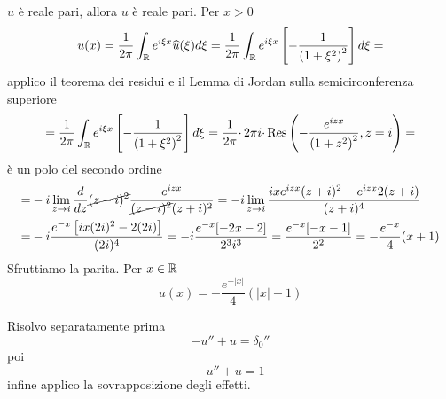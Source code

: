 $\hat{u}$ è reale pari, allora $u$ è reale pari. Per $x >0$
\begin{equation*}
u( x) =\frac{1}{2\pi }\int _{\mathbb{R} } e^{i\xi x}\widehat{u}( \xi ) d\xi =\frac{1}{2\pi }\int _{\mathbb{R} } e^{i\xi x}\left[ -\frac{1}{\left( 1+\xi ^{2}\right)^{2}}\right] d\xi =
\end{equation*}
applico il teorema dei residui e il Lemma di Jordan sulla semicirconferenza superiore
\begin{equation*}
=\frac{1}{2\pi }\int _{\mathbb{R} } e^{i\xi x}\left[ -\frac{1}{\left( 1+\xi ^{2}\right)^{2}}\right] d\xi =\frac{1}{2\pi } \cdotp 2\pi i\cdotp \mathrm{Res}\left( -\frac{e^{izx}}{\left( 1+z^{2}\right)^{2}} ,z=i\right) =
\end{equation*}
è un polo del secondo ordine
\begin{equation*}
\begin{aligned}
= & -i\lim\limits _{z\rightarrow i}\frac{d}{dz}\cancel{( z-i)^{2}}\frac{e^{izx}}{\cancel{( z-i)^{2}}( z+i)^{2}} =-i\lim\limits _{z\rightarrow i}\frac{ixe^{izx}( z+i)^{2} -e^{izx} 2( z+i)}{( z+i)^{4}}\\
= & -i\frac{e^{-x}\left[ ix( 2i)^{2} -2( 2i)\right]}{( 2i)^{4}} =-i\frac{e^{-x}[ -2x-2]}{2^{3} i^{3}} =\frac{e^{-x}[ -x-1]}{2^{2}} =-\frac{e^{-x}}{4}( x+1)
\end{aligned}
\end{equation*}
Sfruttiamo la parita. Per $x\in \mathbb{R} $
\begin{equation*}
u( x) =-\frac{e^{-| x| }}{4}(| x| +1)
\end{equation*}
\Soluzione

Risolvo separatamente prima
\begin{equation*}
-u''+u=\delta _{0} ''
\end{equation*}
poi
\begin{equation*}
-u''+u=1
\end{equation*}
infine applico la sovrapposizione degli effetti.


